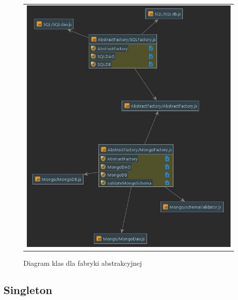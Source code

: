 \documentclass{sprawozdanie-agh}
\begin{document}
	\begin{figure}[H] 
		\centering
		\begin{tabular}{c}
			\includegraphics[width=.95\textwidth]{abstractfactory}
		\end{tabular} 
		\caption{Diagram klas dla fabryki abstrakcyjnej}
	\end{figure}
	
	\subsection{Singleton}
	
\end{document}
